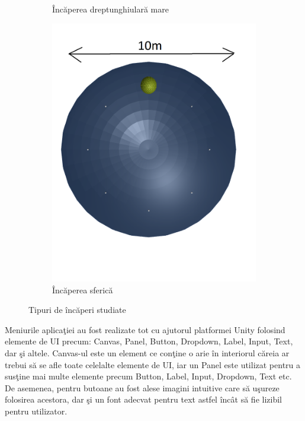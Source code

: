\begin{figure}[!htb]
\begin{subfigure}[b]{.3\textwidth}
			\caption{\^{I}nc\u{a}perea dreptunghiular\u{a} mare}
		\end{subfigure}
		\hfill
		\begin{subfigure}[b]{.3\textwidth}
			\centering
			\includegraphics[width=1\linewidth]{imagini/sphericRoom.png}
			\caption{\^{I}nc\u{a}perea sferic\u{a}}
		\end{subfigure}
		
		\caption{Tipuri de încăperi studiate}
		\label{rooms}
	\end{figure}
	
	 
	Meniurile aplica\c{t}iei au fost realizate tot cu ajutorul platformei Unity folosind elemente de UI precum: Canvas, Panel, Button, Dropdown, Label, Input, Text, dar \c{s}i altele. Canvas-ul este un element ce con\c{t}ine o arie \^{i}n interiorul c\u{a}reia ar trebui s\u{a} se afle toate celelalte elemente de UI, iar un Panel este utilizat pentru a sus\c{t}ine mai multe elemente precum Button, Label, Input, Dropdown, Text etc. De asemenea, pentru butoane au fost alese imagini intuitive care s\u{a} u\c{s}ureze folosirea acestora, dar \c{s}i un font adecvat pentru text astfel \^{i}nc\^{a}t s\u{a} fie lizibil pentru utilizator.
	
